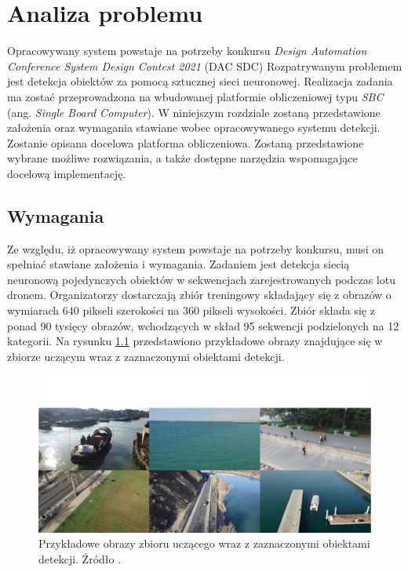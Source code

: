\chapter{Analiza problemu}
\label{cha:Analiza probemu}

Opracowywany system powstaje na potrzeby konkursu \emph{Design Automation Conference System Design Contest 2021} (DAC SDC)
Rozpatrywanym problemem jest detekcja obiektów za pomocą sztucznej sieci neuronowej.
Realizacja zadania ma zostać przeprowadzona na wbudowanej platformie obliczeniowej typu \emph{SBC} (ang. \emph{Single Board Computer}).
W niniejszym rozdziale zostaną przedstawione założenia oraz wymagania stawiane wobec opracowywanego systemu detekcji.
Zostanie opisana docelowa platforma obliczeniowa. Zostaną przedstawione wybrane możliwe rozwiązania, 
a także dostępne narzędzia wspomagające docelową implementację.


\section{Wymagania}
Ze względu, iż opracowywany system powstaje na potrzeby konkursu, 
musi on spełniać stawiane założenia i wymagania.
Zadaniem jest detekcja siecią neuronową pojedynczych obiektów w sekwencjach zarejestrowanych podczas lotu dronem.
Organizatorzy dostarczają zbiór treningowy składający się z obrazów o wymiarach 640 pikseli szerokości na 360 pikseli wysokości. Zbiór składa się z ponad 90 tysięcy obrazów, wchodzących w skład 95 sekwencji podzielonych na 12 kategorii. Na rysunku \ref{fig:sample_images} przedstawiono przykładowe obrazy znajdujące się w zbiorze uczącym wraz z zaznaczonymi obiektami detekcji.
\begin{figure}
    \centering
    \includegraphics[width=\linewidth]{images/sample_images.png}
    \caption{Przykładowe obrazy zbioru uczącego wraz z zaznaczonymi obiektami detekcji. Źródło \cite{dac_sdc_2021}.}
    \label{fig:sample_images}
\end{figure}

